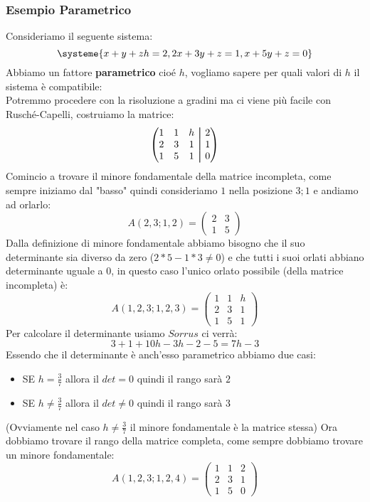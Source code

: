 \subsubsection{Esempio Parametrico}
Consideriamo il seguente sistema:
$$ 
\systeme{
x+y+zh = 2,
2x+3y+z = 1,
x+5y+z = 0
}
$$
Abbiamo un fattore \textbf{parametrico} cioé $h$, vogliamo sapere per quali valori di $h$ il sistema è compatibile:\\
Potremmo procedere con la risoluzione a gradini ma ci viene più facile con Rusché-Capelli, costruiamo la matrice:
$$ 
\begin{pmatrix}
1 & 1 & h & \aug & 2 \\
2 & 3 & 1 & \aug & 1 \\
1 & 5 & 1 & \aug & 0
\end{pmatrix}
$$
Comincio a trovare il minore fondamentale della matrice incompleta, come sempre iniziamo dal "basso" quindi consideriamo $1$ nella posizione $3;1$ e andiamo ad orlarlo:
$$
A(2,3;1,2) = 
\begin{pmatrix}
2 & 3 \\
1 & 5
\end{pmatrix}
$$
Dalla definizione di minore fondamentale abbiamo bisogno che il suo determinante sia diverso da zero ($2*5-1*3 \neq 0$) e che tutti i suoi orlati abbiano determinante uguale a 0, in questo caso l'unico orlato possibile (della matrice incompleta) è:
$$
A(1,2,3;1,2,3) = 
\begin{pmatrix}
1 & 1 & h \\
2 & 3 & 1 \\
1 & 5 & 1
\end{pmatrix}
$$
Per calcolare il determinante usiamo $Sorrus$ ci verrà:
$$ 3+1+10h - 3h-2-5 = 7h-3 $$
Essendo che il determinante è anch'esso parametrico abbiamo due casi:
\begin{itemize}
\item[] SE $h=\frac{3}{7}$ allora il $det = 0$ quindi il rango sarà $2$
\item[] SE $h \neq \frac{3}{7}$ allora il $det \neq 0$ quindi il rango sarà $3$
\end{itemize}
(Ovviamente nel caso $h \neq \frac{3}{7}$ il minore fondamentale è la matrice stessa)
Ora dobbiamo trovare il rango della matrice completa, come sempre dobbiamo trovare un minore fondamentale:
$$ 
A(1,2,3;1,2,4) =
\begin{pmatrix}
1 & 1 & 2 \\
2 & 3 & 1 \\
1 & 5 & 0
\end{pmatrix}
$$
